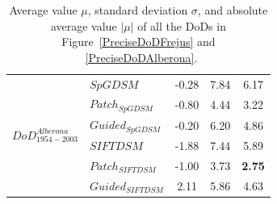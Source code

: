 \begin{table}
\begin{tabular}{||l|l|c|c|c||}
%
%

\multirow{6}{*}{$DoD^{Alberona}_{1954-2003}$}
&${SpGDSM}$ & -0.28 & 7.84 & 6.17\\
&${Patch_{SpGDSM}}$ & -0.80 & 4.44 & 3.22\\
&${Guided_{SpGDSM}}$ & -0.20 & 6.20 & 4.86\\
&${SIFTDSM}$ & -1.88 & 7.44 & 5.89\\
&${Patch_{SIFTDSM}}$ & -1.00 & 3.73 & \textbf{2.75}\\
&${Guided_{SIFTDSM}}$ & 2.11 & 5.86 & 4.63\\\hline
	\end{tabular}
	\caption{Average value $\mu$, standard deviation $\sigma$, and absolute average value $|\mu|$ of all the \ac{DoD}s in Figure~\ref{PreciseDoDFrejus} and ~\ref{PreciseDoDAlberona}.}
	\label{PreciseDoDStatistic}
\end{table}


